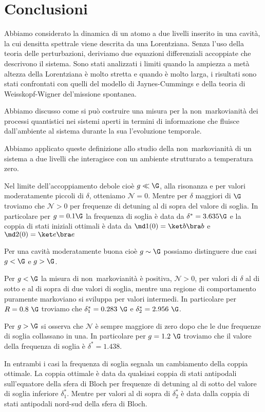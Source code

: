 \chapter*{Conclusioni}

Abbiamo considerato la dinamica di un atomo a due livelli inserito in una cavit\`a, la cui densitta spettrale viene descrita da una Lorentziana. Senza l'uso della teoria delle perturbazioni, deriviamo due equazioni differenziali accoppiate che descrivono il sistema. Sono stati analizzati i limiti quando la ampiezza a met\`a altezza della Lorentziana \`e molto stretta e quando \`e molto larga, i risultati sono stati confrontati con quelli del modello  di Jaynes-Cummings e della teoria di Weisskopf-Wigner del'missione spontanea.

Abbiamo discusso come si pu\`o costruire una misura per la non~markovianit\`a dei processi quantistici nei sistemi aperti in termini di informazione che fluisce dall'ambiente al sistema durante la sua l'evoluzione temporale. 

Abbiamo applicato queste definizione allo studio della non~markovianit\`a di un sistema a due livelli che interagisce con un ambiente strutturato a temperatura zero. 

Nel limite dell'accoppiamento debole cio\`e $g \ll \G$, alla risonanza e per valori moderatamente piccoli di $\delta$, otteniamo $\mathcal{N} = 0$. Mentre per $\delta$ maggiori di $\G$ troviamo che $\mathcal{N} > 0$ per frequenze di detuning al di sopra del valore di soglia. In particolare per $g = 0.1 \G$ la frequenza di soglia \`e data da $\delta^{\ast} = 3.635 \G$ e la coppia di stati iniziali ottimali \`e data da $\md1 (0) = \ket b \bra b$ e $\md2 (0) = \ket e \bra e$

Per una cavit\`a moderatamente buona cio\`e  $g \sim \G$ possiamo distinguere due casi $g < \G$ e $g > \G$. 

Per $g < \G$ la misura di non~markovianit\`a \`e positiva, $ \mathcal{N} > 0 $, per valori di $\delta$ al di sotto e al di sopra di due valori di soglia, mentre una regione di comportamento puramente markoviano si sviluppa per valori intermedi. In particolare per $R = 0.8~\G$ troviamo che $\delta_{1}^{\ast} = 0.283~\G$ e $\delta_{2}^{\ast} = 2.956~\G$.

Per $g > \G$ si osserva che $\mathcal{N}$ \`e sempre maggiore di zero dopo che le due frequenze di soglia collassano in una. In particolare per $g = 1.2~\G$ troviamo che il valore della frequenza di soglia \`e $\delta^{\ast} = 1.438$.

In entrambi i casi la frequenza di soglia segnala un cambiamento della coppia ottimale. La coppia ottimale \`e data da qualsiasi coppia di stati antipodali sull'equatore della sfera di Bloch per frequenze di detuning al di sotto del valore di soglia inferiore $\delta_{1}^{\ast}$. Mentre per valori al di sopra di $\delta_{2}^{\ast}$ \`e data dalla coppia di stati antipodali nord-sud della sfera di Bloch.
